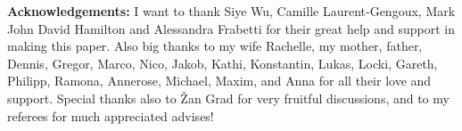 \documentclass[reqno,a4paper,oneside]{amsart}
\theoremstyle{plain}
\theoremstyle{remark}
\theoremstyle{definition}
\begin{document}
\textbf{Acknowledgements:} I want to thank Siye Wu, Camille Laurent-Gengoux, Mark John David Hamilton and Alessandra Frabetti for their great help and support in making this paper. Also big thanks to my wife Rachelle, my mother, father, Dennis, Gregor, Marco, Nico, Jakob, Kathi, Konstantin, Lukas, Locki, Gareth, Philipp, Ramona, Annerose, Michael, Maxim, and Anna for all their love and support. Special thanks also to Žan Grad for very fruitful discussions, and to my referees for much appreciated advises!






\appendix
\setcounter{equation}{0}
\renewcommand{\theequation}{\Alph{section}.\arabic{equation}} %

\renewcommand\refname{List of References}





\end{document}
